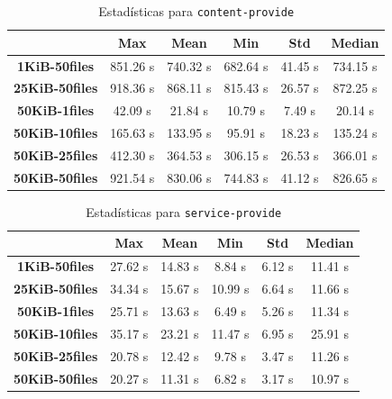 \setlength\tabcolsep{10pt}
\begin{table}[!htbp]
    \centering
    \begin{tabular}{|c|c|c|c|c|c|}
    \hline
    & \textbf{Max} & \textbf{Mean} & \textbf{Min} & \textbf{Std} & \textbf{Median} \\
    \hline
    \textbf{1KiB-50files} & 851.26 s & 740.32 s & 682.64 s & 41.45 s & 734.15 s \\
    \hline
    \textbf{25KiB-50files} & 918.36 s & 868.11 s & 815.43 s & 26.57 s & 872.25 s \\
    \hline
    \textbf{50KiB-1files} & 42.09 s & 21.84 s & 10.79 s & 7.49 s & 20.14 s \\
    \hline
    \textbf{50KiB-10files} & 165.63 s & 133.95 s & 95.91 s & 18.23 s & 135.24 s \\
    \hline
    \textbf{50KiB-25files} & 412.30 s & 364.53 s & 306.15 s & 26.53 s & 366.01 s \\
    \hline
    \textbf{50KiB-50files} & 921.54 s & 830.06 s & 744.83 s & 41.12 s & 826.65 s \\
    \hline
    \end{tabular}
    \caption{Estadísticas para \texttt{content-provide}}
\end{table}

\setlength\tabcolsep{10pt}
\begin{table}[!htbp]
    \centering
    \begin{tabular}{|c|c|c|c|c|c|}
    \hline
    & \textbf{Max} & \textbf{Mean} & \textbf{Min} & \textbf{Std} & \textbf{Median} \\
    \hline
    \textbf{1KiB-50files} & 27.62 s & 14.83 s & 8.84 s & 6.12 s & 11.41 s \\
    \hline
    \textbf{25KiB-50files} & 34.34 s & 15.67 s & 10.99 s & 6.64 s & 11.66 s \\
    \hline
    \textbf{50KiB-1files} & 25.71 s & 13.63 s & 6.49 s & 5.26 s & 11.34 s \\
    \hline
    \textbf{50KiB-10files} & 35.17 s & 23.21 s & 11.47 s & 6.95 s & 25.91 s \\
    \hline
    \textbf{50KiB-25files} & 20.78 s & 12.42 s & 9.78 s & 3.47 s & 11.26 s \\
    \hline
    \textbf{50KiB-50files} & 20.27 s & 11.31 s & 6.82 s & 3.17 s & 10.97 s \\
    \hline
    \end{tabular}
    \caption{Estadísticas para \texttt{service-provide}}
\end{table}

